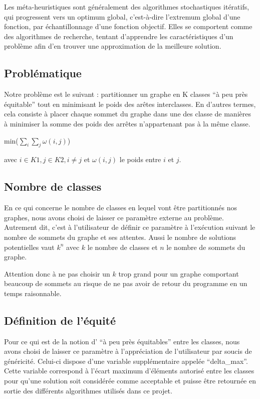 \documentclass[a4paper]{article}
\begin{document}
	Les méta-heuristiques sont généralement des algorithmes stochastiques itératifs, qui progressent vers un optimum global, c'est-à-dire l'extremum global d'une fonction, par échantillonnage d’une fonction objectif. Elles se comportent comme des algorithmes de recherche, tentant d’apprendre les caractéristiques d’un problème afin d’en trouver une approximation de la meilleure solution.

	\subsection{Problématique}
	Notre problème est le suivant : partitionner un graphe en K classes ``à peu près équitable'' tout en minimisant le poids des arêtes interclasses. En d'autres termes, cela consiste à placer chaque sommet du graphe dans une des classe de manières à minimiser la somme des poids des arrêtes n'appartenant pas à la même classe.
	\begin{center}
	min($\sum\limits_{i} \sum\limits_{j}  \omega (i,j)$)
	\end{center}
	avec $i \in K1, j \in K2, i \ne j$ et $\omega (i,j)$ le poids entre $i$ et $j$.

	\subsection{Nombre de classes}
	En ce qui concerne le nombre de classes en lequel vont être partitionnés nos graphes, nous avons choisi de laisser ce paramètre externe au problème. Autrement dit, c'est à l'utilisateur de définir ce paramètre à l’exécution suivant le nombre de sommets du graphe et ses attentes.
	Aussi le nombre de solutions potentielles vaut $k^n$ avec $k$ le nombre de classes et $n$ le nombre de sommets du graphe. 

	Attention donc à ne pas choisir un $k$ trop grand pour un graphe comportant beaucoup de sommets au risque de ne pas avoir de retour du programme en un temps raisonnable. 

	\subsection{Définition de l'équité}

	Pour ce qui est de la notion d' ``à peu près équitables'' entre les classes, nous avons choisi de laisser ce paramètre à l'appréciation de l'utilisateur par soucis de généricité. Celui-ci dispose d'une variable supplémentaire appelée ``delta\_max''. Cette variable correspond à l'écart maximum d'éléments autorisé entre les classes pour qu'une solution soit considérée comme acceptable et puisse être retournée en sortie des différents algorithmes utilisés dans ce projet.
\end{document}
